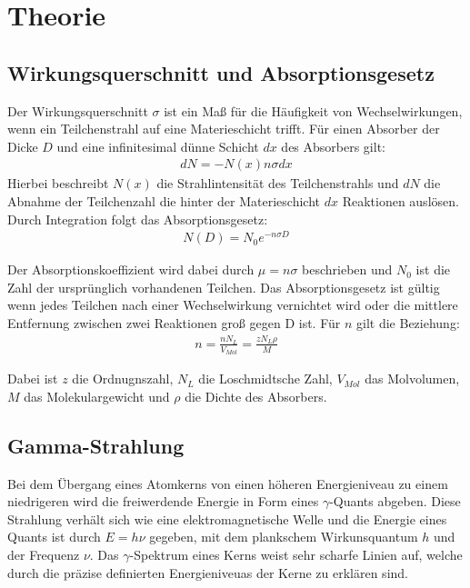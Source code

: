\section{Theorie}
\label{sec:Theorie}

\cite{sample}
\subsection{Wirkungsquerschnitt und Absorptionsgesetz}
Der Wirkungsquerschnitt $\sigma$ ist ein Maß für die Häufigkeit von Wechselwirkungen, wenn ein Teilchenstrahl
auf eine Materieschicht trifft. Für einen Absorber der Dicke $D$ und eine infinitesimal dünne Schicht $dx$ des
Absorbers gilt:
\begin{align}
  dN = -N(x)n \sigma dx
\end{align}
Hierbei beschreibt $N(x)$ die Strahlintensität des Teilchenstrahls und $dN$ die Abnahme der Teilchenzahl
die hinter der Materieschicht $dx$ Reaktionen auslösen. Durch Integration folgt das Absorptionsgesetz:
\begin{align}
  N(D) = N_0 e^{-n  \sigma D}
\end{align}

Der Absorptionskoeffizient wird dabei durch $\mu = n \sigma$ beschrieben und $N_0$ ist die Zahl der ursprünglich
vorhandenen Teilchen. Das Absorptionsgesetz ist gültig wenn jedes Teilchen nach einer Wechselwirkung vernichtet wird oder
die mittlere Entfernung zwischen zwei Reaktionen groß gegen D ist. Für $n$ gilt die Beziehung:
\begin{align}
  n = \frac{n N_L}{V_{Mol}} = \frac{z N_L \rho}{M}
\end{align}

Dabei ist $z$ die Ordnugnszahl, $N_L$ die Loschmidtsche Zahl, $V_{Mol}$ das Molvolumen, $M$ das Molekulargewicht
und $\rho$ die Dichte des Absorbers.


\subsection{Gamma-Strahlung}

Bei dem Übergang eines Atomkerns von einen höheren Energieniveau zu einem niedrigeren wird die
freiwerdende Energie in Form eines $\gamma$-Quants abgeben. Diese Strahlung verhält sich wie eine elektromagnetische Welle und
die Energie eines Quants ist durch $E = h \nu$ gegeben, mit dem plankschem Wirkunsquantum $h$ und der Frequenz $\nu$.
Das $\gamma$-Spektrum  eines Kerns weist sehr scharfe Linien auf, welche durch die präzise definierten Energieniveuas der Kerne
zu erklären sind.

